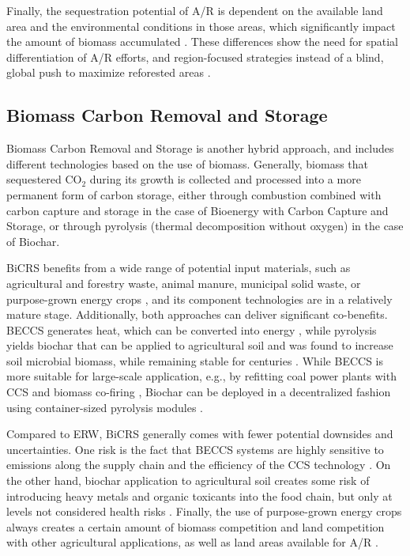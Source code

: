 Finally, the sequestration potential of A/R is dependent on the available land area and the environmental conditions in those areas, which significantly impact the amount of biomass accumulated \parencite[4.69]{eggleston_2006_2006}. These differences show the need for spatial differentiation of A/R efforts, and region-focused strategies instead of a blind, global push to maximize reforested areas \parencite{liang_climate_2025}.

\subsection{Biomass Carbon Removal and Storage}
Biomass Carbon Removal and Storage is another hybrid approach, and includes different technologies based on the use of biomass. Generally, biomass that sequestered CO$_2$ during its growth is collected and processed into a more permanent form of carbon storage, either through combustion combined with carbon capture and storage in the case of Bioenergy with Carbon Capture and Storage, or through pyrolysis (thermal decomposition without oxygen) in the case of Biochar.\vspace{2mm}

BiCRS benefits from a wide range of potential input materials, such as agricultural and forestry waste, animal manure, municipal solid waste, or purpose-grown energy crops \parencite{dipple_building_2021}, and its component technologies are in a relatively mature stage. Additionally, both approaches can deliver significant co-benefits. BECCS generates heat, which can be converted into energy \parencite{hanssen_biomass_2020}, while pyrolysis yields biochar that can be applied to agricultural soil and was found to increase soil microbial biomass, while remaining stable for centuries \parencite{biswal_use_2025}. While BECCS is more suitable for large-scale application, e.g., by refitting coal power plants with CCS and biomass co-firing \parencite{jones_delivering_2021}, Biochar can be deployed in a decentralized fashion using container-sized pyrolysis modules \parencite{horizon_europe_exploiting_2025}.\vspace{2mm}

Compared to ERW, BiCRS generally comes with fewer potential downsides and uncertainties. One risk is the fact that BECCS systems are highly sensitive to emissions along the supply chain and the efficiency of the CCS technology \parencite{jones_delivering_2021}. On the other hand, biochar application to agricultural soil creates some risk of introducing heavy metals and organic toxicants into the food chain, but only at levels not considered health risks \parencite{uba_chancen_2016}. Finally, the use of purpose-grown energy crops always creates a certain amount of biomass competition and land competition with other agricultural applications, as well as land areas available for A/R \parencite{uba_chancen_2016, zhao_trade-offs_2024}.


